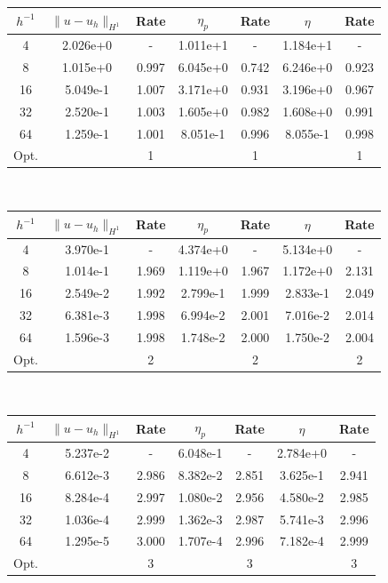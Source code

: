 \\
\begin{center}
\centering
\begin{tabular}{c|c|c|c|c|c|c} 
$h^{-1}$ & $\|u-u_h \|_{H^1}$ & Rate & $\eta_p$ & Rate & $\eta$ & Rate\\\hline
4 & 2.026e+0  & -     & 1.011e+1 & -     & 1.184e+1 &   -\\
8 & 1.015e+0  & 0.997 & 6.045e+0 & 0.742 & 6.246e+0 & 0.923 \\
16 & 5.049e-1 & 1.007 & 3.171e+0 & 0.931 & 3.196e+0 & 0.967\\
32 & 2.520e-1 & 1.003 & 1.605e+0 & 0.982 & 1.608e+0 & 0.991 \\
64 & 1.259e-1 & 1.001 & 8.051e-1 & 0.996 & 8.055e-1 & 0.998 \\\hline
Opt. & & 1 & & 1 & & 1
\end{tabular}
 \label{tab:poisson_P1}
\end{center}
\mbox{}\\
\begin{center} 
\centering
\begin{tabular}{c|c|c|c|c|c|c}
$h^{-1}$ & $\|u-u_h \|_{H^1}$ & Rate & $\eta_p$ & Rate & $\eta$ & Rate\\\hline
4  & 3.970e-1 & -     & 4.374e+0 & - 	& 5.134e+0 &   -\\
8  & 1.014e-1 & 1.969 & 1.119e+0 & 1.967 & 1.172e+0 & 2.131 \\
16 & 2.549e-2 & 1.992 & 2.799e-1 & 1.999 & 2.833e-1 & 2.049\\
32 & 6.381e-3 & 1.998 & 6.994e-2 & 2.001 & 7.016e-2 & 2.014 \\
64 & 1.596e-3 & 1.998 & 1.748e-2 & 2.000 & 1.750e-2 & 2.004  \\\hline
Opt. & & 2 & & 2 & & 2
\end{tabular}
 \label{tab:poisson_P2}
\end{center}
\mbox{}\\
\begin{center} 
\centering
\begin{tabular}{c|c|c|c|c|c|c}
$h^{-1}$ & $\|u-u_h \|_{H^1}$ & Rate & $\eta_p$ & Rate & $\eta$ & Rate\\\hline
4  & 5.237e-2 & -     & 6.048e-1 & -     & 2.784e+0 & - \\
8  & 6.612e-3 & 2.986 & 8.382e-2 & 2.851 & 3.625e-1 & 2.941 \\
16 & 8.284e-4 & 2.997 & 1.080e-2 & 2.956 & 4.580e-2 & 2.985 \\
32 & 1.036e-4 & 2.999 & 1.362e-3 & 2.987 & 5.741e-3 & 2.996 \\
64 & 1.295e-5 & 3.000 & 1.707e-4 & 2.996 & 7.182e-4 & 2.999 \\\hline
Opt. & & 3 & & 3 & & 3
\end{tabular}
 \label{tab:poisson_P3}
\end{center}
